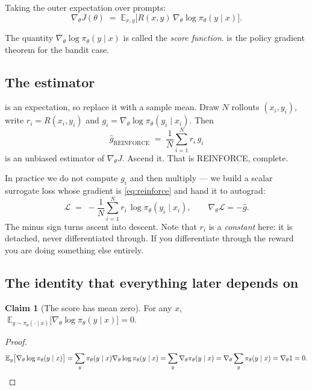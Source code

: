\documentclass[11pt,letterpaper]{article}
\theoremstyle{definition}
\newtheorem{claim}{Claim}[section]
\newcommand{\E}{\mathbb{E}}
\newcommand{\pol}{\pi_\theta}
\newcommand{\grad}{\nabla_\theta}
\newcommand{\score}{\grad \log \pol(y \mid x)}
\newcommand{\scorei}{g_i}
\begin{document}
Taking the outer expectation over prompts:
\begin{equation}
  \boxed{\;\grad J(\theta) \;=\; \E_{x, y}\big[ R(x,y) \, \score \big].\;}
  \label{eq:pgt}
\end{equation}

The quantity $\score$ is called the \emph{score function}.  is the policy gradient
theorem for the bandit case.

\subsection{The estimator}

 is an expectation, so replace it with a sample mean. Draw $N$ rollouts
$(x_i, y_i)$, write $r_i = R(x_i, y_i)$ and $\scorei = \grad \log \pol(y_i \mid x_i)$. Then
\begin{equation}
  \hat{g}_{\text{REINFORCE}} \;=\; \frac{1}{N}\sum_{i=1}^{N} r_i \, \scorei
  \label{eq:reinforce}
\end{equation}
is an unbiased estimator of $\grad J$. Ascend it. That is REINFORCE, complete.

In practice we do not compute $\scorei$ and then multiply --- we build a scalar surrogate loss whose
gradient is \eqref{eq:reinforce} and hand it to autograd:
\begin{equation}
  \mathcal{L} \;=\; -\frac{1}{N}\sum_{i=1}^{N} r_i \, \log \pol(y_i \mid x_i),
  \qquad \grad \mathcal{L} = -\hat{g}.
  \label{eq:surrogate}
\end{equation}
The minus sign turns ascent into descent. Note that $r_i$ is a \emph{constant} here: it is detached,
never differentiated through. If you differentiate through the reward you are doing something else
entirely.

\subsection{The identity that everything later depends on}

\begin{claim}[The score has mean zero]
\label{claim:zeromean}
For any $x$, $\;\E_{y \sim \pol(\cdot\mid x)}\big[\score\big] = 0.$
\end{claim}

\begin{proof}
\begin{equation}
  \E_y\big[\score\big]
  = \sum_y \pol(y\mid x) \grad \log \pol(y \mid x)
  = \sum_y \grad \pol(y \mid x)
  = \grad \sum_y \pol(y \mid x)
  = \grad 1 = 0. \qedhere
\end{equation}
\end{proof}
\end{document}
